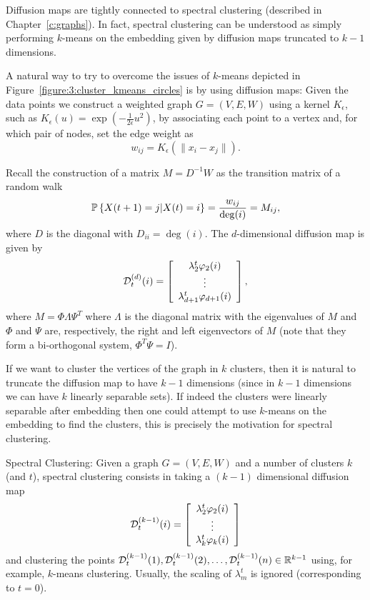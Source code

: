 Diffusion maps are tightly connected to spectral clustering (described in Chapter~\ref{c:graphs}). In fact, spectral clustering can be understood as simply performing $k$-means on the embedding given by diffusion maps truncated to $k-1$ dimensions.

A natural way to try to overcome the issues of $k$-means depicted in Figure~\ref{figure:3:cluster_kmeans_circles} is by using diffusion maps: Given the data points we construct a weighted graph $G = (V,E,W)$ using a kernel $K_{\epsilon}$, such as $K_{\epsilon}(u) = \exp\left(-\frac1{2\epsilon}u^2\right)$, by associating each point to a vertex and, for which pair of nodes, set the edge weight as
\[
w_{ij} = K_{\epsilon}\left( \|x_i-x_j\| \right).
\]

Recall the construction of a matrix $M = D^{-1}W$ as the transition matrix of a random walk
\[
{\mathbb{P}}\left\{ X(t+1) = j | X(t) = i \right\} = \frac{w_{ij}}{\deg(i)} = M_{ij},
\]
where $D$ is the diagonal with $D_{ii} = \deg(i)$. The $d$-dimensional diffusion map is given by
\[
\mathcal{D}_t^{(d)}(i) = \left[  \begin{array}{c}  \lambda_2^t \varphi_2(i) \\ \vdots \\  \lambda_{d+1}^t \varphi_{d+1}(i) \end{array} \right],
\]
where $M  = \Phi \Lambda \Psi^T$ where $\Lambda$ is the diagonal matrix with the eigenvalues of $M$ and $\Phi$ and $\Psi$ are, respectively, the right and left eigenvectors of $M$ (note that they form a bi-orthogonal system, $\Phi^T\Psi = I$).

If we want to cluster the vertices of the graph in $k$ clusters, then it is natural to truncate the diffusion map to have $k-1$ dimensions (since in $k-1$ dimensions we can have $k$ linearly separable sets). If indeed the clusters were linearly separable after embedding then one could attempt to use $k$-means on the embedding to find the clusters, this is precisely the motivation for spectral clustering.

\begin{algorithm}
Spectral Clustering: Given a graph $G=(V,E,W)$ and a number of clusters $k$ (and $t$), spectral clustering consists in taking a $(k-1)$ dimensional diffusion map
\[
\mathcal{D}_{t}^{(k-1)}(i) =  \left[  \begin{array}{c}  \lambda_2^t \varphi_2(i) \\ \vdots \\  \lambda_{k}^t \varphi_{k}(i) \end{array} \right]
\]
and clustering the points $\mathcal{D}_{t}^{(k-1)}(1),\mathcal{D}_{t}^{(k-1)}(2),\dots,\mathcal{D}_{t}^{(k-1)}(n)\in\mathbb{R}^{k-1}$ using, for example, $k$-means clustering. Usually, the scaling of $\lambda_m^t$ is ignored (corresponding to $t=0$).
\caption{Spectral clustering described using diffusion maps.}
\label{DMAPS:algorithm:3:spectralclustering}
\end{algorithm}

